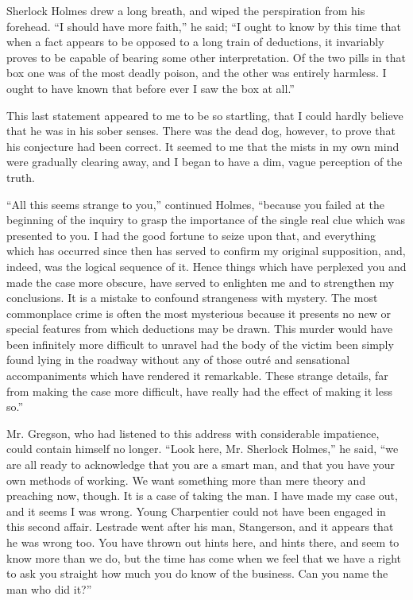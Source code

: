 \documentclass[12pt]{book}
\begin{document}
Sherlock Holmes drew a long breath, and wiped the perspiration from his forehead. “I should have more faith,” he said; “I ought to know by this time that when a fact appears to be opposed to a long train of deductions, it invariably proves to be capable of bearing some other interpretation. Of the two pills in that box one was of the most deadly poison, and the other was entirely harmless. I ought to have known that before ever I saw the box at all.” 

This last statement appeared to me to be so startling, that I could hardly believe that he was in his sober senses. There was the dead dog, however, to prove that his conjecture had been correct. It seemed to me that the mists in my own mind were gradually clearing away, and I began to have a dim, vague perception of the truth. 

“All this seems strange to you,” continued Holmes, “because you failed at the beginning of the inquiry to grasp the importance of the single real clue which was presented to you. I had the good fortune to seize upon that, and everything which has occurred since then has served to confirm my original supposition, and, indeed, was the logical sequence of it. Hence things which have perplexed you and made the case more obscure, have served to enlighten me and to strengthen my conclusions. It is a mistake to confound strangeness with mystery. The most commonplace crime is often the most mysterious because it presents no new or special features from which deductions may be drawn. This murder would have been infinitely more difficult to unravel had the body of the victim been simply found lying in the roadway without any of those outré and sensational accompaniments which have rendered it remarkable. These strange details, far from making the case more difficult, have really had the effect of making it less so.” 

Mr. Gregson, who had listened to this address with considerable impatience, could contain himself no longer. “Look here, Mr. Sherlock Holmes,” he said, “we are all ready to acknowledge that you are a smart man, and that you have your own methods of working. We want something more than mere theory and preaching now, though. It is a case of taking the man. I have made my case out, and it seems I was wrong. Young Charpentier could not have been engaged in this second affair. Lestrade went after his man, Stangerson, and it appears that he was wrong too. You have thrown out hints here, and hints there, and seem to know more than we do, but the time has come when we feel that we have a right to ask you straight how much you do know of the business. Can you name the man who did it?” 
\end{document}
